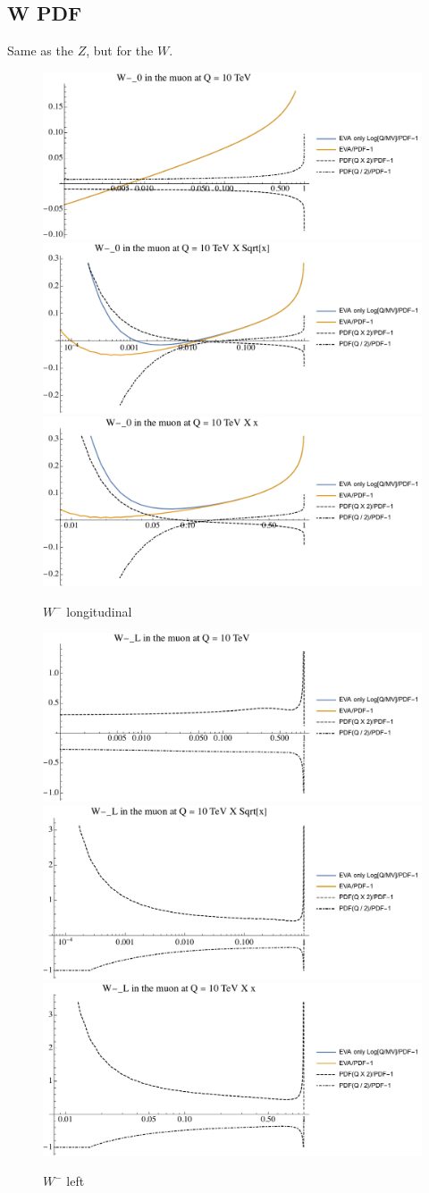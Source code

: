 \documentclass[a4paper,11pt]{article}
\begin{document}
\clearpage
\pagebreak

\subsection{W PDF}
\label{app:PDFsEVA_W}

Same as the $Z$, but for the $W$.


\begin{figure}[!b]
\includegraphics[width=0.46\linewidth]{Notebooks/PlotPDFs/ratios/10TeV/W-_0_Q.pdf}
\includegraphics[width=0.46\linewidth]{Notebooks/PlotPDFs/ratios/10TeV/W-_0_Qsqrtx.pdf}
\includegraphics[width=0.46\linewidth]{Notebooks/PlotPDFs/ratios/10TeV/W-_0_Qx.pdf}
\caption{$W^-$ longitudinal}
\end{figure}

\begin{figure}[!b]
\includegraphics[width=0.46\linewidth]{Notebooks/PlotPDFs/ratios/10TeV/W-_L_Q.pdf}
\includegraphics[width=0.46\linewidth]{Notebooks/PlotPDFs/ratios/10TeV/W-_L_Qsqrtx.pdf}
\includegraphics[width=0.46\linewidth]{Notebooks/PlotPDFs/ratios/10TeV/W-_L_Qx.pdf}
\caption{$W^-$ left}
\end{figure}
\end{document}
